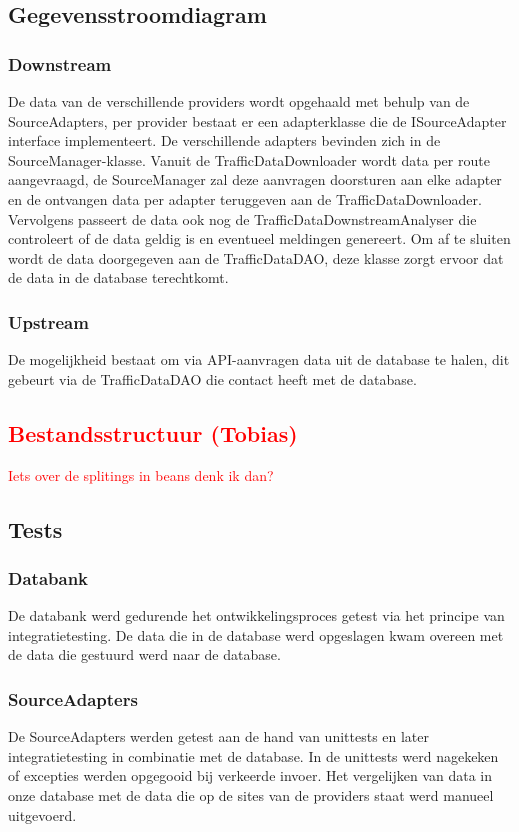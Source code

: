 \documentclass[ps,a4paper,oneside]{report}
\begin{document}
\subsection{Gegevensstroomdiagram}
\subsubsection{Downstream}
De data van de verschillende providers wordt opgehaald met behulp van de SourceAdapters, per provider bestaat er een adapterklasse die de ISourceAdapter interface implementeert. De verschillende adapters bevinden zich in de \\SourceManager-klasse. Vanuit de TrafficDataDownloader wordt data per route aangevraagd, de SourceManager zal deze aanvragen doorsturen aan elke adapter en de ontvangen data per adapter teruggeven aan de TrafficDataDownloader. Vervolgens passeert de data ook nog de TrafficDataDownstreamAnalyser die controleert of de data geldig is en eventueel meldingen genereert. Om af te sluiten wordt de data doorgegeven aan de TrafficDataDAO, deze klasse zorgt ervoor dat de data in de database terechtkomt. 
\subsubsection{Upstream}
De mogelijkheid bestaat om via API-aanvragen data uit de database te halen, dit gebeurt via de TrafficDataDAO die contact heeft met de database.
\textcolor{red}{\subsection{Bestandsstructuur (Tobias)}
Iets over de splitings in beans denk ik dan?
}
\subsection{Tests}
\subsubsection{Databank}
De databank werd gedurende het ontwikkelingsproces getest via het principe van integratietesting. De data die in de database werd opgeslagen kwam overeen met de data die gestuurd werd naar de database.
\subsubsection{SourceAdapters}
De SourceAdapters werden getest aan de hand van unittests en later integratietesting in combinatie met de database. In de unittests werd nagekeken of excepties werden opgegooid bij verkeerde invoer. Het vergelijken van data in onze database met de data die op de sites van de providers staat werd manueel uitgevoerd.
\end{document}
